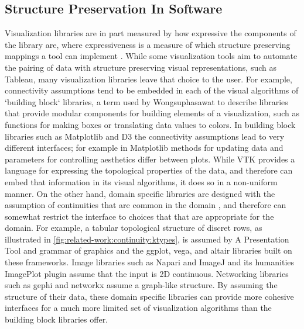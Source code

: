 \documentclass[10pt,journal,compsoc]{IEEEtran}
\theoremstyle{definition}
\theoremstyle{remark}
\begin{document}
\subsection{Structure Preservation In Software}
\label{sec:related-work:software}
Visualization libraries are in part measured by how expressive the components of the library are, where expressiveness is a measure of which structure preserving mappings a tool can implement \cite{mackinlayAutomatingDesignGraphical1986}. While some visualization tools aim to automate the pairing of data with structure preserving visual representations, such as Tableau\cite{StoltePolaris2002,hanrahanVizQL2006,MackinlayShowme2007}, many visualization libraries leave that choice to the user. For example, connectivity assumptions tend to be embedded in each of the visual algorithms of `building block` libraries, a term used by Wongsuphasawat \cite{wongsuphasawatNavigatingWideWorld2021} to describe libraries that provide modular components for building elements of a visualization, such as functions for making boxes or translating data values to colors. In building block libraries such as Matplotlib\cite{hunterMatplotlib2DGraphics2007} and D3\cite{bostockDataDrivenDocuments2011} the connectivity assumptions lead to very different interfaces; for example in Matplotlib methods for updating data and parameters for controlling aesthetics differ between plots. While VTK\cite{hanwellVisualizationToolkitVTK2015,geveciVTK2012} provides a language for expressing the topological properties of the data, and therefore can embed that information in its visual algorithms, it does so in a non-uniform manner. On the other hand, domain specific libraries are designed with the assumption of continuities that are common in the domain \cite{HeerSoftware2006}, and therefore can somewhat restrict the interface to choices that that are appropriate for the domain. For example, a tabular topological structure of discret rows, as illustrated in \autoref{fig:related-work:continuity:ktypes}, is assumed by 
A Presentation Tool\cite{mackinlayAutomatingDesignGraphical1986, mackinlayAutomatingDesignGraphical1986} and grammar of graphics\cite{wilkinsonGrammarGraphics2005} and the ggplot\cite{wickhamGgplot2ElegantGraphics2016}, vega\cite{satyanarayanDeclarativeInteractionDesign2014}, and altair\cite{vanderplasAltairInteractiveStatistical2018} libraries built on these frameworks. Image libraries such as Napari\cite{nicholas_sofroniew_2021_4533308} and ImageJ\cite{schneiderNIHImageImageJ2012} and its humanities ImagePlot\cite{studiesCulturevisImageplot2021} plugin assume that the input is 2D continuous. Networking libraries such as gephi\cite{bastianGephiOpenSource2009} and networkx\cite{HagbergExploringNetwork2008} assume a graph-like structure. By assuming the structure of their data, these domain specific libraries can provide more cohesive interfaces for a much more limited set of visualization algorithms than the building block libraries offer.
\end{document}
